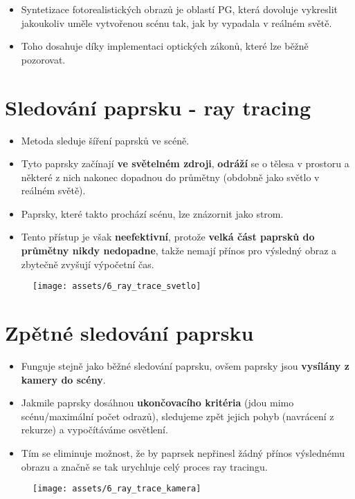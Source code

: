 \begin{itemize}
    \item Syntetizace fotorealistických obrazů je oblastí PG, která dovoluje vykreslit jakoukoliv uměle vytvořenou scénu tak, jak by vypadala v reálném světě.
    \item Toho dosahuje díky implementaci optických zákonů, které lze běžně pozorovat.
\end{itemize}

\section{Sledování paprsku - ray tracing}
\begin{itemize}
    \item Metoda sleduje šíření paprsků ve scéně.
    \item Tyto paprsky začínají \textbf{ve světelném zdroji}, \textbf{odráží} se o tělesa v prostoru a některé z nich nakonec dopadnou do průmětny (obdobně jako světlo v reálném světě).
    \item Paprsky, které takto prochází scénu, lze znázornit jako strom.
    \item Tento přístup je však \textbf{neefektivní}, protože \textbf{velká část paprsků do průmětny nikdy nedopadne}, takže nemají přínos pro výsledný obraz a zbytečně zvyšují výpočetní čas.
\end{itemize}
\begin{figure}[H]
    \centering
    \texttt{[image: assets/6\_ray\_trace\_svetlo]}
\end{figure}

\section{Zpětné sledování paprsku}
\begin{itemize}
    \item Funguje stejně jako běžné sledování paprsku, ovšem paprsky jsou \textbf{vysílány z kamery do scény}.
    \item Jakmile paprsky dosáhnou \textbf{ukončovacího kritéria} (jdou mimo scénu/maximální počet odrazů), sledujeme zpět jejich pohyb (navrácení z rekurze) a vypočítáváme osvětlení.
    \item Tím se eliminuje možnost, že by paprsek nepřinesl žádný přínos výslednému obrazu a značně se tak urychluje celý proces ray tracingu.
\end{itemize}
\begin{figure}[H]
    \centering
    \texttt{[image: assets/6\_ray\_trace\_kamera]}
\end{figure}

